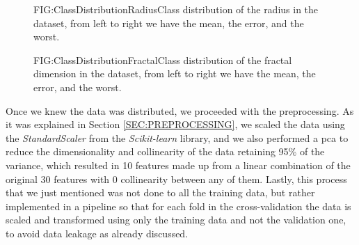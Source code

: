 \begin{figure}[Class Distribution of the Radius]{FIG:ClassDistributionRadius}{Class distribution of the radius in the dataset, from left to right we have the mean, the error, and the worst.}
\end{figure}

\begin{figure}[Class Distribution of the Fractal Dimension]{FIG:ClassDistributionFractal}{Class distribution of the fractal dimension in the dataset, from left to right we have the mean, the error, and the worst.}
\end{figure}

Once we knew the data was distributed, we proceeded with the preprocessing. As it was explained in Section \ref{SEC:PREPROCESSING}, we scaled the data using the \textit{StandardScaler} from the \textit{Scikit-learn} library, and we also performed a \ac{pca} to reduce the dimensionality and collinearity of the data retaining 95\% of the variance, which resulted in 10 features made up from a linear combination of the original 30 features with 0 collinearity between any of them. Lastly, this process that we just mentioned was not done to all the training data, but rather implemented in a pipeline so that for each fold in the cross-validation the data is scaled and transformed using only the training data and not the validation one, to avoid data leakage as already discussed.